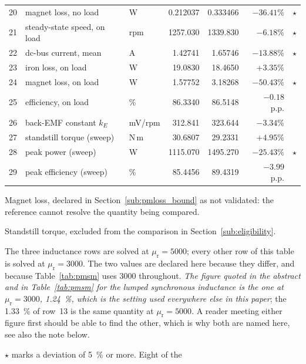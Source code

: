 \documentclass[10pt,a4paper,twocolumn]{article}
\theoremstyle{plain}
\theoremstyle{remark}
\begin{document}
\begin{table}[!t]
\begin{threeparttable}
\begin{tabular}{@{}rllrrrc@{}}
20 & magnet loss, no load\tnote{a} & W & \num{0.212037} & \num{0.333466} & $-36.41\%$ & $\star$\\
21 & steady-state speed, on load & rpm & \num{1257.030} & \num{1339.830} & $-6.18\%$ & $\star$\\
22 & dc-bus current, mean & A & \num{1.42741} & \num{1.65746} & $-13.88\%$ & $\star$\\
23 & iron loss, on load & W & \num{19.0830} & \num{18.4650} & $+3.35\%$ & \\
24 & magnet loss, on load\tnote{a} & W & \num{1.57752} & \num{3.18268} & $-50.43\%$ & $\star$\\
25 & efficiency, on load & \% & \num{86.3340} & \num{86.5148} & $-0.18$ p.p. & \\
26 & back-EMF constant $k_E$ & mV/rpm & \num{312.841} & \num{323.644} & $-3.34\%$ & \\
27 & standstill torque (sweep)\tnote{b} & N\,m & \num{30.6807} & \num{29.2331} & $+4.95\%$ & \\
28 & peak power (sweep) & W & \num{1115.070} & \num{1495.270} & $-25.43\%$ & $\star$\\
29 & peak efficiency (sweep) & \% & \num{85.4456} & \num{89.4319} & $-3.99$ p.p. & \\
\bottomrule
\end{tabular}
\begin{tablenotes}[flushleft]\footnotesize
\item[a] Magnet loss, declared in Section~\ref{sub:pmloss_bound} as not
validated: the reference cannot resolve the quantity being compared.
\item[b] Standstill torque, excluded from the comparison in
Section~\ref{sub:eligibility}.
\item[c] The three inductance rows are solved at $\mu_{\mathrm{r}}=5000$;
every other row of this table is solved at $\mu_{\mathrm{r}}=3000$. The
two values are declared here because they differ, and because
Table~\ref{tab:pmsm} uses \num{3000} throughout. \emph{The figure quoted
in the abstract and in Table~\ref{tab:pmsm} for the lumped synchronous
inductance is the one at $\mu_{\mathrm{r}}=3000$, \SI{+1.24}{\percent},
which is the setting used everywhere else in this paper}; the
\SI{+1.33}{\percent} of row~13 is the same quantity at
$\mu_{\mathrm{r}}=5000$. A reader meeting either figure first should be
able to find the other, which is why both are named here, see also the
note below.
\item $\star$ marks a deviation of \SI{5}{\percent} or more. Eight of the

\end{tablenotes}
\end{threeparttable}
\end{table}
\end{document}
